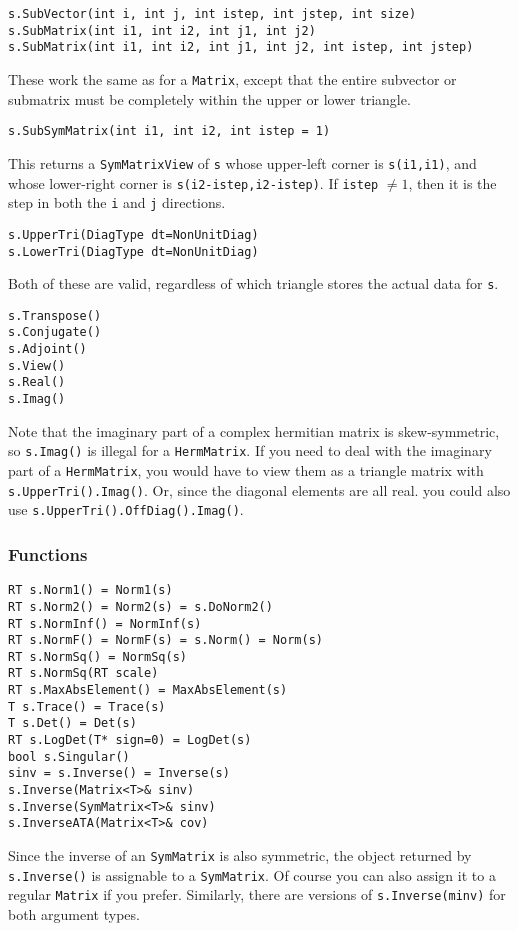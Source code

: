 \documentclass[twoside,letterpaper,11pt]{article}
\renewcommand{\tt}[1]{{\texttt {#1}}}
\begin{document}
\begin{verbatim}
s.SubVector(int i, int j, int istep, int jstep, int size)
s.SubMatrix(int i1, int i2, int j1, int j2)
s.SubMatrix(int i1, int i2, int j1, int j2, int istep, int jstep)
\end{verbatim}
These work the same as for a \tt{Matrix}, except that the entire
subvector or submatrix must be completely within the upper or lower triangle.

\begin{verbatim}
s.SubSymMatrix(int i1, int i2, int istep = 1)
\end{verbatim}
This returns a \tt{SymMatrixView} of \tt{s} whose upper-left
corner is \tt{s(i1,i1)}, and whose lower-right corner is 
\tt{s(i2-istep,i2-istep)}.  If \tt{istep} $\neq 1$, then it is the 
step in both the \tt{i} and \tt{j} directions.

\begin{verbatim}
s.UpperTri(DiagType dt=NonUnitDiag)
s.LowerTri(DiagType dt=NonUnitDiag)
\end{verbatim}
Both of these are valid, regardless
of which triangle stores the actual data for \tt{s}.
\begin{verbatim}
s.Transpose()
s.Conjugate()
s.Adjoint()
s.View()
s.Real()
s.Imag()
\end{verbatim}
Note that the imaginary part of a complex hermitian matrix is skew-symmetric,
so \tt{s.Imag()} is illegal for a \tt{HermMatrix}.  If you need to
deal with the imaginary part of a \tt{HermMatrix},
you would have to view them as a triangle matrix with \tt{s.UpperTri().Imag()}.  Or, 
since the diagonal elements are all real.
you could also use \tt{s.UpperTri().OffDiag().Imag()}. 

\subsubsection{Functions}

\begin{verbatim}
RT s.Norm1() = Norm1(s)
RT s.Norm2() = Norm2(s) = s.DoNorm2()
RT s.NormInf() = NormInf(s)
RT s.NormF() = NormF(s) = s.Norm() = Norm(s)
RT s.NormSq() = NormSq(s)
RT s.NormSq(RT scale)
RT s.MaxAbsElement() = MaxAbsElement(s)
T s.Trace() = Trace(s)
T s.Det() = Det(s)
RT s.LogDet(T* sign=0) = LogDet(s)
bool s.Singular()
sinv = s.Inverse() = Inverse(s)
s.Inverse(Matrix<T>& sinv)
s.Inverse(SymMatrix<T>& sinv)
s.InverseATA(Matrix<T>& cov)
\end{verbatim}
Since the inverse of an \tt{SymMatrix} is also symmetric,
the object returned by \tt{s.Inverse()} is 
assignable to a \tt{SymMatrix}.  Of course you can also assign it
to a regular \tt{Matrix} if you prefer.  Similarly, there are versions
of \tt{s.Inverse(minv)} for both argument types.  
\end{document}

